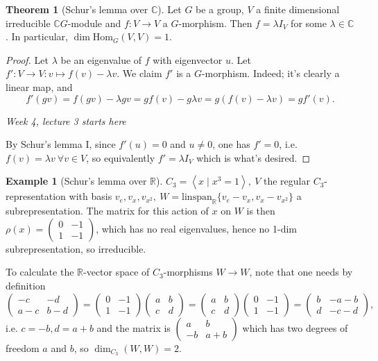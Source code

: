 \documentclass{article}
\newcommand{\la}{\left\langle}
\newcommand{\ra}{\right\rangle}
\newcommand{\R}{\mathbb{R}}
\newcommand{\C}{\mathbb{C}}
\newcommand{\Hom}{\text{Hom}}
\theoremstyle{definition}
\newtheorem{thm}[defn]{Theorem}
\newtheorem{example}[defn]{Example}
\begin{document}
\begin{thm}[Schur's lemma over $\C$]
\label{thm:SchurslemmaoverC}
Let $G$ be a group, $V$ a finite dimensional irreducible $\C G$-module and $f:V\rightarrow V$ a $G$-morphism. Then $f=\lambda I_V$ for some $\lambda\in\C$. In particular, $\dim\Hom_G(V,V)=1$.
\end{thm}
\begin{proof}
Let $\lambda$ be an eigenvalue of $f$ with eigenvector $u$. Let $f':V\rightarrow V:v\mapsto f(v)-\lambda v$. We claim $f'$ is a $G$-morphism. Indeed; it's clearly a linear map, and
\[
f'(gv)=f(gv)-\lambda gv=gf(v)-g\lambda v=g(f(v)-\lambda v)=gf'(v).
\]

\begin{flushright}
\textit{Week 4, lecture 3 starts here}
\end{flushright}

By Schur's lemma I, since $f'(u)=0$ and $u\neq 0$, one has $f'=0$, i.e. $f(v)=\lambda v \ \forall v\in V$, so equivalently $f'=\lambda I_V$ which is what's desired.
\end{proof}

\begin{example}[Schur's lemma over $\R$]
$C_3=\la x\mid x^3=1\ra,\ V$ the regular $C_3$-representation with basis $v_e,v_x,v_{x^2},\ W=\text{linspan}_\R\{v_e-v_x,v_x-v_{x^2}\}$ a subrepresentation. The matrix for this action of $x$ on $W$ is then $\rho(x)=\begin{pmatrix}0&-1\\1&-1\end{pmatrix}$, which has no real eigenvalues, hence no 1-dim subrepresentation, so irreducible.

To calculate the $\R$-vector space of $C_3$-morphisms $W\rightarrow W$, note that one needs by definition
\[
\begin{pmatrix}-c&-d\\a-c&b-d\end{pmatrix}=\begin{pmatrix}0&-1\\1&-1\end{pmatrix}\begin{pmatrix}a&b\\c&d\end{pmatrix}=\begin{pmatrix}a&b\\c&d\end{pmatrix}\begin{pmatrix}0&-1\\1&-1\end{pmatrix}=\begin{pmatrix}b&-a-b\\d&-c-d\end{pmatrix},
\]
i.e. $c=-b,d=a+b$ and the matrix is $\begin{pmatrix}a&b\\-b&a+b\end{pmatrix}$ which has two degrees of freedom $a$ and $b$, so $\dim_{C_3}(W,W)=2$.
\end{example}
\end{document}
